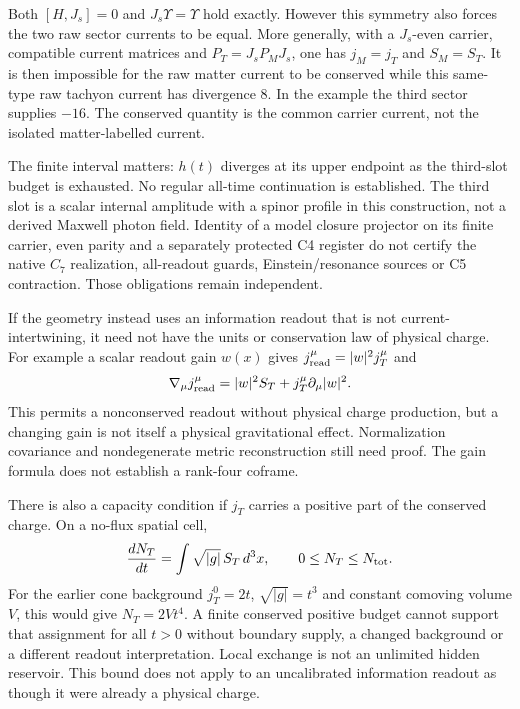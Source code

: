 \documentclass[11pt,a4paper]{article}
\begin{document}
Both $[H,J_s]=0$ and $J_s\Upsilon=\Upsilon$ hold exactly.
However this symmetry also forces the two raw sector currents to be
equal. More generally, with a $J_s$-even carrier, compatible current
matrices and $P_T=J_sP_MJ_s$, one has $j_M=j_T$ and $S_M=S_T$.
It is then impossible for the raw matter current to be conserved while
this same-type raw tachyon current has divergence $8$. In the example
the third sector supplies $-16$. The conserved quantity is the common
carrier current, not the isolated matter-labelled current.

The finite interval matters: $h(t)$ diverges at its upper endpoint as
the third-slot budget is exhausted. No regular all-time continuation
is established. The third slot is a scalar internal amplitude with a
spinor profile in this construction, not a derived Maxwell photon
field. Identity of a model closure projector on its finite carrier,
even parity and a separately protected C4 register do not certify
the native $C_7$ realization, all-readout guards, Einstein/resonance
sources or C5 contraction. Those obligations remain independent.

If the geometry instead uses an information readout that is not
current-intertwining, it need not have the units or conservation law of
physical charge. For example a scalar readout gain $w(x)$ gives
$j_{\rm read}^\mu=|w|^2j_T^\mu$ and
\[
 \nabla_\mu j_{\rm read}^\mu
 =|w|^2S_T+j_T^\mu\partial_\mu|w|^2.
\]
This permits a nonconserved readout without physical charge production,
but a changing gain is not itself a physical gravitational effect.
Normalization covariance and nondegenerate metric reconstruction still
need proof. The gain formula does not establish a rank-four coframe.

There is also a capacity condition if $j_T$ carries a positive part of
the conserved charge. On a no-flux spatial cell,
\[
 \frac{dN_T}{dt}=\int\sqrt{|g|}\,S_T\,d^3x,
 \qquad 0\le N_T\le N_{\rm tot}.
\]
For the earlier cone background $j_T^0=2t$, $\sqrt{|g|}=t^3$ and
constant comoving volume $V$, this would give $N_T=2Vt^4$.
A finite conserved positive budget cannot support that assignment for
all $t>0$ without boundary supply, a changed background or a different
readout interpretation. Local exchange is not an unlimited hidden
reservoir. This bound does not apply to an uncalibrated information
readout as though it were already a physical charge.
\end{document}
